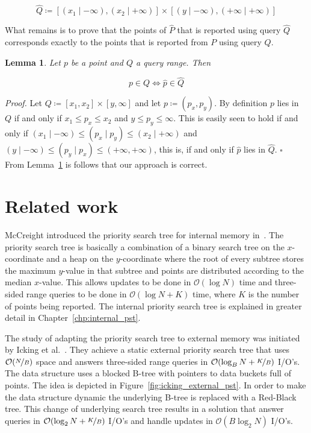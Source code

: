 \documentclass[twoside,11pt,openright]{report}
\newtheorem{lemma}{Lemma}
\begin{document}
$$ \hat{Q} \coloneqq [(x_1 \mid -\infty), (x_2 \mid +\infty)] \times [(y \mid -\infty),(+\infty \mid +\infty)] $$

What remains is to prove that the points of $\hat{P}$ that is reported using query $\hat{Q}$ corresponds exactly to the points that is reported from $P$ using query $Q$.

\begin{lemma}
\label{lma:composite_universe_query}
Let $p$ be a point and $Q$ a query range. Then

$$ p \in Q \Leftrightarrow \hat{p} \in \hat{Q} $$
\end{lemma}

\textit{Proof.} Let $Q \coloneqq [x_1, x_2] \times [y, \infty]$ and let $p \coloneqq (p_x,p_y)$. By definition $p$ lies in $Q$ if and only if $x_1 \leq p_x \leq x_2$ and $y \leq p_y \leq \infty$. This is easily seen to hold if and only if $(x_1 \mid -\infty) \leq (p_x \mid p_y) \leq (x_2 \mid +\infty)$ and $(y \mid -\infty) \leq (p_y \mid p_x) \leq (+\infty, +\infty)$, this is, if and only if $\hat{p}$ lies in $\hat{Q}$. $\square$ \\

From Lemma~\ref{lma:composite_universe_query} is follows that our approach is correct.

\chapter{Related work}
\label{chp:related_work}
McCreight introduced the priority search tree for internal memory in~\cite{DBLP:journals/siamcomp/McCreight85}. The priority search tree is basically a combination of a binary search tree on the $x$-coordinate and a heap on the $y$-coordinate where the root of every subtree stores the maximum $y$-value in that subtree and points are distributed according to the median $x$-value. This allows updates to be done in $\mathcal{O}(\log N)$ time and three-sided range queries to be done in $\mathcal{O}(\log N + K)$ time, where $K$ is the number of points being reported. The internal priority search tree is explained in greater detail in Chapter~\ref{chp:internal_pst}.

The study of adapting the priority search tree to external memory was initiated by Icking et al.~\cite{Icking1988}. They achieve a static external priority search tree that uses $\mathcal{O}(\nicefrac{N}{B})$ space and answers three-sided range queries in $\mathcal{O}(\log_B N + \nicefrac{K}{B})$ I/O's. The data structure uses a blocked B-tree with pointers to data buckets full of points. The idea is depicted in Figure~\ref{fig:icking_external_pst}. In order to make the data structure dynamic the underlying B-tree is replaced with a Red-Black tree. This change of underlying search tree results in a solution that answer queries in $\mathcal{O}(\log_2 N + \nicefrac{K}{B})$ I/O's and handle updates in $\mathcal{O}(B \log_2 N)$ I/O's.
\end{document}
